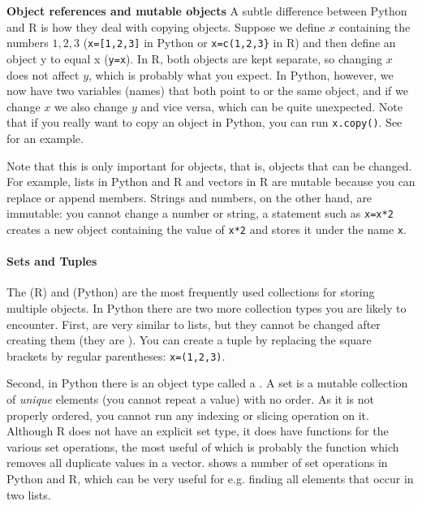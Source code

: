 \begin{feature}\textbf{Object references and mutable objects}
  A subtle difference between Python and R is how they deal with copying objects.
  Suppose we define $x$ containing the numbers $1,2,3$ (\verb|x=[1,2,3]| in Python or \verb|x=c(1,2,3}| in R)
  and then define an object y to equal x (\verb|y=x|).
  In R, both objects are kept separate, so changing $x$ does not affect $y$,
  which is probably what you expect.
  In Python, however, we now have two variables (names) that both point to or  the same object,
  and if we change $x$ we also change $y$ and vice versa, which can be quite unexpected.
  Note that if you really want to copy an object in Python, you can run \verb|x.copy()|.
  See  for an example.

  Note that this is only important for  objects, that is,
  objects that can be changed.
  For example, lists in Python and R and vectors in R are mutable because you can replace or append members.
  Strings and numbers, on the other hand, are immutable:
  you cannot change a number or string, a statement such as \verb|x=x*2| creates a new object containing the value of \verb|x*2| and stores it under the name \verb|x|.

\end{feature}
  

\paragraph{Sets and Tuples}
The  (R) and  (Python) are the most frequently used collections
for storing multiple objects. 
In Python there are two more collection types you are likely to encounter.
First,  are very similar to lists, but they cannot be changed after creating them
(they are ).
You can create a tuple by replacing the square brackets by regular parentheses:
\verb|x=(1,2,3)|. 

Second, in Python there is an object type called a .
A set is a mutable collection of \emph{unique} elements (you cannot repeat a value) with
no order. As it is not properly ordered, you cannot run any indexing
or slicing operation on it.
Although R does not have an explicit set type,
it does have functions for the various set operations,
the most useful of which is probably the function  which removes all duplicate values in a vector.
 shows a number of set operations in Python and R,
which can be very useful for e.g. finding all elements that occur in two lists.

